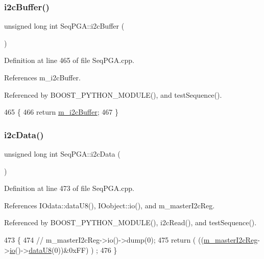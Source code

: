 \subsubsection{\texorpdfstring{i2c\+Buffer()}{i2cBuffer()}}
{\footnotesize\ttfamily unsigned long int Seq\+P\+G\+A\+::i2c\+Buffer (\begin{DoxyParamCaption}{ }\end{DoxyParamCaption})}



Definition at line 465 of file Seq\+P\+G\+A.\+cpp.



References m\+\_\+i2c\+Buffer.



Referenced by B\+O\+O\+S\+T\+\_\+\+P\+Y\+T\+H\+O\+N\+\_\+\+M\+O\+D\+U\+L\+E(), and test\+Sequence().


\begin{DoxyCode}
465                                    \{
466   \textcolor{keywordflow}{return} \hyperlink{classSeqPGA_afcef519379e9c6ba624ba58a4eac79f1}{m\_i2cBuffer};
467 \}
\end{DoxyCode}
\mbox{\label{classSeqPGA_a5e48f7b7ca1ada5a1decc0436dda4b26}} 
\subsubsection{\texorpdfstring{i2c\+Data()}{i2cData()}}
{\footnotesize\ttfamily unsigned long int Seq\+P\+G\+A\+::i2c\+Data (\begin{DoxyParamCaption}{ }\end{DoxyParamCaption})}



Definition at line 473 of file Seq\+P\+G\+A.\+cpp.



References I\+Odata\+::data\+U8(), I\+Oobject\+::io(), and m\+\_\+master\+I2c\+Reg.



Referenced by B\+O\+O\+S\+T\+\_\+\+P\+Y\+T\+H\+O\+N\+\_\+\+M\+O\+D\+U\+L\+E(), i2c\+Read(), and test\+Sequence().


\begin{DoxyCode}
473                                  \{
474   \textcolor{comment}{//  m\_masterI2cReg->io()->dump(0);}
475   \textcolor{keywordflow}{return} ( ((\hyperlink{classSeqPGA_a942c71b33a4f43b7a994cb9216abb17e}{m\_masterI2cReg}->\hyperlink{classIOobject_af04fb94137c3d86849f478ac5afab5d1}{io}()->\hyperlink{classIOdata_a75e9c318dbac3a39402179070943d4bc}{dataU8}(0))&0xFF) ) ;
476 \}
\end{DoxyCode}
\mbox{\label{classSeqPGA_a1d9edf6e3303581efe0bdb1b8b3fff0c}} 
